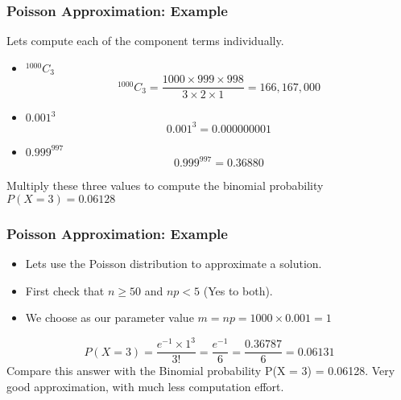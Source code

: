 \documentclass[IntroMain.tex]{subfiles}
\begin{document}
\begin{frame}
	\frametitle{Poisson Approximation: Example}
	Lets compute each of the component terms individually.
	
	\begin{itemize}
		\item $^{1000}C_{3}$
		\[^{1000}C_{3} = \frac{1000 \times 999 \times 998}{3 \times 2 \times 1} = 166,167,000\]
		\item $0.001^3$
		\[0.001^3 = 0.000000001\]
		\item $0.999^{997}$
		\[0.999^{997} = 0.36880\]
	\end{itemize}
	
	
	Multiply these three values to compute the binomial probability
	$P(X = 3) = 0.06128$
\end{frame}

\begin{frame}
	\frametitle{Poisson Approximation: Example}
	\begin{itemize}
		\item Lets use the Poisson distribution to approximate a solution.
		\item First check that $n \geq 50$ and $np < 5$ (Yes to both).
		\item We choose as our parameter value $m = np = 1000 \times 0.001 = 1$
	\end{itemize}
	\[P(X = 3) = \frac{e^{-1} \times 1^3}{3!} = \frac{e^{-1}}{6} = \frac{0.36787}{6} = 0.06131 \]
	Compare this answer with the Binomial probability
	P(X = 3) = 0.06128.
	Very good approximation, with much less computation effort.
\end{frame}
\end{document}
